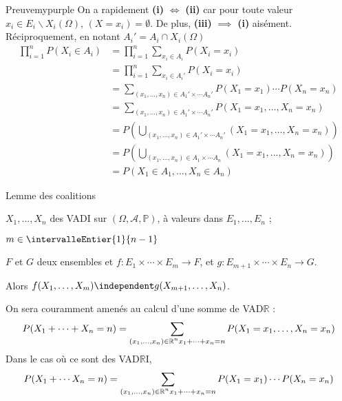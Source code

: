     \begin{demo}{Preuve}{mypurple}
        On a rapidement \textbf{(i)} $\iff$ \textbf{(ii)} car pour toute valeur $x_i \in E_i \backslash X_i(\Omega)$, $(X = x_i) = \emptyset$. De plus, \textbf{(iii)} $\implies$ \textbf{(i)} aisément. Réciproquement, en notant $A_i' = A_i \cap X_i(\Omega)$
        \begin{align*}
            \prod_{i = 1}^n P(X_i \in A_i) &= \prod_{i = 1}^n \sum_{x_i \in A_i} P(X_i = x_i) \\
            &= \prod_{i = 1}^n \sum_{x_i \in A_i'} P(X_i = x_i) \\
            &= \sum_{(x_1,\ldots,x_n) \in A_1'\times \cdots A_n'} P(X_1 = x_1) \cdots P(X_n = x_n) \\
            &= \sum_{(x_1,\ldots,x_n) \in A_1'\times \cdots A_n'} P(X_1 = x_1, \ldots, X_n = x_n) \\
            &= P\left(\bigcup_{(x_1,\ldots,x_n) \in A_1'\times \cdots A_n'} (X_1 = x_1, \ldots, X_n = x_n)\right) \\
            &= P\left(\bigcup_{(x_1,\ldots,x_n) \in A_1\times \cdots A_n} (X_1 = x_1, \ldots, X_n = x_n)\right) \\
            &= P(X_1 \in A_1, \ldots, X_n \in A_n)
        \end{align*}
    \end{demo}

    \begin{theo}{Lemme des coalitions}{}
        \begin{soit}
            \item $X_1,\ldots,X_n$ des VADI sur $\left(\Omega, \mathcal{A}, \mathbb{P}\right)$, à valeurs dans $E_1, \ldots, E_n$ ;
            \item $m \in \intervalleEntier{1}{n-1}$
            \item $F$ et $G$ deux ensembles et $f : E_1 \times \cdots \times E_m \to F$, et $g : E_{m+1} \times \cdots \times E_n \to G$. 
        \end{soit}
        Alors $f(X_1,\ldots,X_m) \independent g(X_{m+1}, \ldots, X_n)$. 
    \end{theo}

    On sera couramment amenés au calcul d’une somme de VAD$\mathbb{R}$ : 
    \[ P(X_1 + \cdots + X_n = n) = \sum_{\substack{(x_1,\ldots,x_n) \in \mathbb{R}^n} \\ x_1 + \cdots + x_n = n} P(X_1= x_1,\ldots,X_n = x_n) \]    
    Dans le cas où ce sont des VAD$\mathbb{R}$I, 
    \[ P(X_1 + \cdots X_n = n) = \sum_{\substack{(x_1,\ldots,x_n) \in \mathbb{R}^n} \\ x_1 + \cdots + x_n = n} P(X_1= x_1)\cdots P(X_n = x_n) \]   


